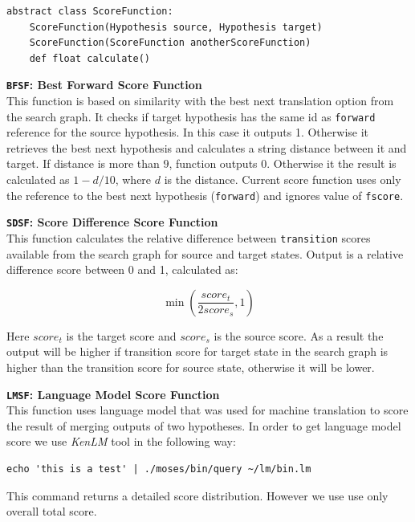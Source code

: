\begin{verbatim}
abstract class ScoreFunction:
    ScoreFunction(Hypothesis source, Hypothesis target)
    ScoreFunction(ScoreFunction anotherScoreFunction)
    def float calculate()
\end{verbatim}


\begin{flushleft}

\textbf{\texttt{BFSF}: \textbf{Best Forward Score Function}} \\
This function is based on similarity with the best next translation option from the search graph. It checks if target hypothesis has the same id as \texttt{forward} reference for the source hypothesis. In this case it outputs 1. Otherwise it retrieves the best next hypothesis and calculates a string distance between it and target. If distance is more than $9$, function outputs $0$. Otherwise it the result is calculated as $1-d/10$, where $d$ is the distance. Current score function uses only the reference to the best next hypothesis (\texttt{forward}) and ignores value of \texttt{fscore}.  \\
\bigskip

\textbf{\texttt{SDSF}: \textbf{Score Difference Score Function}} \\
This function calculates the relative difference between \texttt{transition} scores available from the search graph for source and target states. Output is a relative difference score between 0 and 1, calculated as:
\begin{large}
\begin{equation}
\min(\frac{score_{t}}{2 score_{s}}, 1)
\end{equation}
\end{large}
Here $score_{t}$ is the target score and $score_{s}$ is the source score. As a result the output will be higher if transition score for target state in the search graph is higher than the transition score for source state, otherwise it will be lower.
\bigskip


\textbf{\texttt{LMSF}: \textbf{Language Model Score Function}} \\
This function uses language model that was used for machine translation to score the result of merging outputs of two hypotheses. In order to get language model score we use \emph{KenLM} tool in the following way:

\begin{verbatim}
echo 'this is a test' | ./moses/bin/query ~/lm/bin.lm
\end{verbatim}

This command returns a detailed score distribution. However we use use only overall total score.
\bigskip

\end{flushleft}


